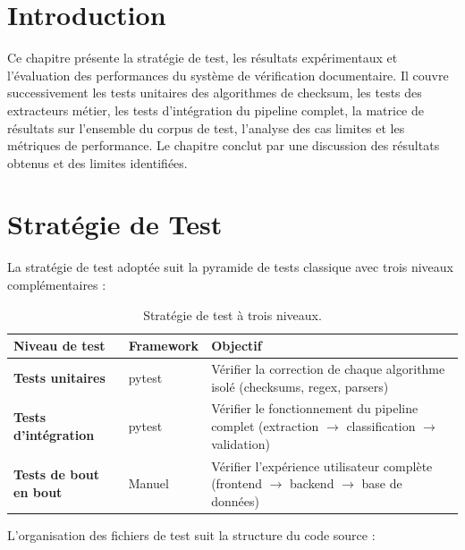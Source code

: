 
\section*{Introduction}

Ce chapitre pr\'{e}sente la strat\'{e}gie de test, les r\'{e}sultats exp\'{e}rimentaux et l'\'{e}valuation des performances du syst\`{e}me de v\'{e}rification documentaire. Il couvre successivement les tests unitaires des algorithmes de checksum, les tests des extracteurs m\'{e}tier, les tests d'int\'{e}gration du pipeline complet, la matrice de r\'{e}sultats sur l'ensemble du corpus de test, l'analyse des cas limites et les m\'{e}triques de performance. Le chapitre conclut par une discussion des r\'{e}sultats obtenus et des limites identifi\'{e}es.

\section{Strat\'{e}gie de Test}

La strat\'{e}gie de test adopt\'{e}e suit la pyramide de tests classique avec trois niveaux compl\'{e}mentaires :

\begin{table}[H]
\centering
\small
\begin{tabularx}{\textwidth}{@{}>{\bfseries}p{3.5cm} p{2.5cm} Y@{}}
\toprule
{}
Niveau de test & Framework & Objectif \\
\midrule
Tests unitaires & pytest & V\'{e}rifier la correction de chaque algorithme isol\'{e} (checksums, regex, parsers) \\
Tests d'int\'{e}gration & pytest & V\'{e}rifier le fonctionnement du pipeline complet (extraction $\to$ classification $\to$ validation) \\
Tests de bout en bout & Manuel & V\'{e}rifier l'exp\'{e}rience utilisateur compl\`{e}te (frontend $\to$ backend $\to$ base de donn\'{e}es) \\
\bottomrule
\end{tabularx}
\caption{Strat\'{e}gie de test \`{a} trois niveaux.}
\label{tab:strategie-test}
\end{table}

L'organisation des fichiers de test suit la structure du code source :

